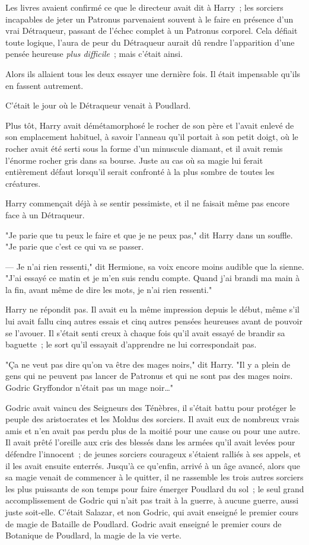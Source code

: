 Les livres avaient confirmé ce que le directeur avait dit à Harry~; les sorciers incapables de jeter un Patronus parvenaient souvent à le faire en présence d'un vrai Détraqueur, passant de l'échec complet à un Patronus corporel. Cela défiait toute logique, l'aura de peur du Détraqueur aurait dû rendre l'apparition d'une pensée heureuse \emph{plus difficile}~; mais c'était ainsi.

Alors ils allaient tous les deux essayer une dernière fois. Il était impensable qu'ils en fassent autrement.

C'était le jour où le Détraqueur venait à Poudlard.

Plus tôt, Harry avait démétamorphosé le rocher de son père et l'avait enlevé de son emplacement habituel, à savoir l'anneau qu'il portait à son petit doigt, où le rocher avait été serti sous la forme d'un minuscule diamant, et il avait remis l'énorme rocher gris dans sa bourse. Juste au cas où sa magie lui ferait entièrement défaut lorsqu'il serait confronté à la plus sombre de toutes les créatures.

Harry commençait déjà à se sentir pessimiste, et il ne faisait même pas encore face à un Détraqueur.

"Je parie que tu peux le faire et que je ne peux pas," dit Harry dans un souffle. "Je parie que c'est ce qui va se passer.

--- Je n'ai rien ressenti," dit Hermione, sa voix encore moins audible que la sienne. "J'ai essayé ce matin et je m'en suis rendu compte. Quand j'ai brandi ma main à la fin, avant même de dire les mots, je n'ai rien ressenti."

Harry ne répondit pas. Il avait eu la même impression depuis le début, même s'il lui avait fallu cinq autres essais et cinq autres pensées heureuses avant de pouvoir se l'avouer. Il s'était senti creux à chaque fois qu'il avait essayé de brandir sa baguette~; le sort qu'il essayait d'apprendre ne lui correspondait pas.

"Ça ne veut pas dire qu'on va être des mages noirs," dit Harry. "Il y a plein de gens qui ne peuvent pas lancer de Patronus et qui ne sont pas des mages noirs. Godric Gryffondor n'était pas un mage noir…"

Godric avait vaincu des Seigneurs des Ténèbres, il s'était battu pour protéger le peuple des aristocrates et les Moldus des sorciers. Il avait eux de nombreux vrais amis et n'en avait pas perdu plus de la moitié pour une cause ou pour une autre. Il avait prêté l'oreille aux cris des blessés dans les armées qu'il avait levées pour défendre l'innocent~; de jeunes sorciers courageux s'étaient ralliés à ses appels, et il les avait ensuite enterrés. Jusqu'à ce qu'enfin, arrivé à un âge avancé, alors que sa magie venait de commencer à le quitter, il ne rassemble les trois autres sorciers les plus puissants de son temps pour faire émerger Poudlard du sol~; le seul grand accomplissement de Godric qui n'ait pas trait à la guerre, à aucune guerre, aussi juste soit-elle. C'était Salazar, et non Godric, qui avait enseigné le premier cours de magie de Bataille de Poudlard. Godric avait enseigné le premier cours de Botanique de Poudlard, la magie de la vie verte.

